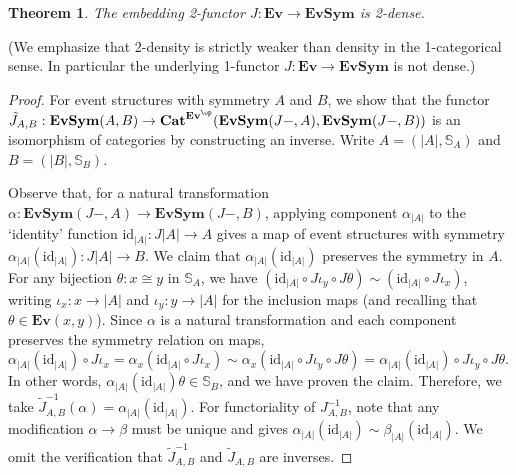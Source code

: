 \documentclass[11pt,a4paper]{article}
\theoremstyle{plain}
\newtheorem{theorem}{Theorem}[section]
\theoremstyle{definition}
\theoremstyle{remark}
\newcommand{\ES}{\mathbf{Ev}}
\newcommand{\SES}{\mathbf{EvSym}}
\newcommand{\id}{\mathrm{id}}
\newcommand{\Cat}{\mathbf{Cat}}
\begin{document}
\begin{theorem}
The embedding 2-functor $J : \ES \to \SES$ is 2-dense.
\end{theorem}
(We emphasize that 2-density is strictly weaker than density in the 1-categorical sense. In particular the underlying 1-functor $J : \ES \to \SES$ is not dense.)
\begin{proof}
For event structures with symmetry $A$ and $B$, we show that the functor $\tilde{J}_{A ,B} : \SES(A, B) \to \Cat^{\ES^\op}(\SES(J-, A), \SES(J-, B))$ is an isomorphism of categories by constructing an inverse. Write $A = (|A|, \mathbb{S}_A)$ and $B = (|B|, \mathbb{S}_B)$. 

Observe that, for a natural transformation $\alpha : \SES(J-, A) \to \SES(J-, B)$, applying component $\alpha_{|A|}$ to the `identity' function $\id_{|A|} : J|A| \to A$ gives a map of event structures with symmetry $\alpha_{|A|}(\id_{|A|}) : J|A| \to B$. We claim that $\alpha_{|A|}(\id_{|A|})$ preserves the symmetry in $A$. For any bijection $\theta: x \cong y$ in $\mathbb{S}_A$, we have $(\id_{|A|} \circ J\iota_y \circ J\theta) \sim (\id_{|A|} \circ J\iota_x)$, writing $\iota_x : x \to |A|$ and $\iota_y : y \to |A|$ for the inclusion maps (and recalling that $\theta \in \ES(x, y)$). Since $\alpha$ is a natural transformation and each component preserves the symmetry relation on maps,  $\alpha_{|A|}(\id_{|A|}) \circ J{\iota_x} = \alpha_x (\id_{|A|} \circ J{\iota_x}) \sim \alpha_x(\id_{|A|} \circ J{\iota_y} \circ J\theta) = \alpha_{|A|}(\id_{|A|}) \circ J\iota_y \circ J\theta.$ In other words, $\alpha_{|A|}(\id_{|A|}) \theta \in \mathbb{S}_B$, and we have proven the claim. Therefore, we take $\tilde J_{A, B}^{-1}(\alpha) = \alpha_{|A|}(\id_{|A|})$. For functoriality of $J_{A, B}^{-1}$, note that any modification $\alpha \to \beta$ must be unique and gives $\alpha_{|A|}(\id_{|A|})\sim \beta_{|A|}(\id_{|A|})$. We omit the verification that $\tilde J_{A, B}^{-1}$ and $\tilde J_{A, B}$ are inverses. 
\end{proof}
\end{document}
